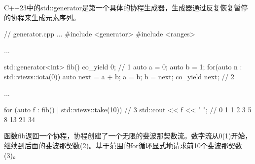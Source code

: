 
C++23中的std::generator是第一个具体的协程生成器，生成器通过反复恢复暂停的协程来生成元素序列。


\begin{cpp}
// generator.cpp
...
#include <generator>
#include <ranges>

...

std::generator<int> fib() {
	co_yield 0; // 1
	auto a = 0;
	auto b = 1;
	for(auto n : std::views::iota(0)) {
		auto next = a + b;
		a = b;
		b = next;
		co_yield next; // 2
	}
}

...

for (auto f : fib() | std::views::take(10)) { // 3
	std::cout << f << " "; // 0 1 1 2 3 5 8 13 21 34
}
\end{cpp}

函数fib返回一个协程，协程创建了一个无限的斐波那契数流。数字流从0(1)开始，继续到后面的斐波那契数(2)。基于范围的for循环显式地请求前10个斐波那契数(3)。





